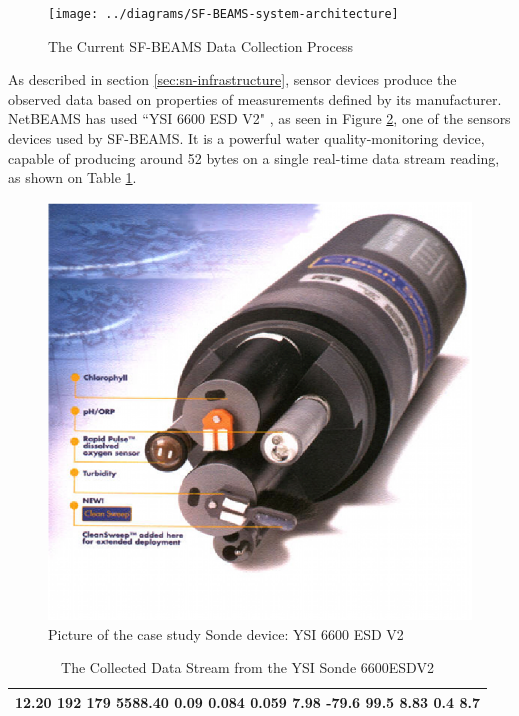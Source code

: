 \begin{figure}[!b]
  \centering
  \texttt{[image: ../diagrams/SF-BEAMS-system-architecture]}
  \caption{The Current SF-BEAMS Data Collection Process}
  \label{fig:SF-BEAMS-system-architecture}
\end{figure}

As described in section \ref{sec:sn-infrastructure}, sensor devices produce
the observed data based on properties of measurements defined by its
manufacturer. NetBEAMS has used ``YSI 6600 ESD V2" \cite{YSI-Sonde}, as seen
in Figure \ref{fig:ysi-device}, one of the sensors devices used by SF-BEAMS.
It is a powerful water quality-monitoring device, capable of producing around
52 bytes on a single real-time data stream reading, as shown on Table
\ref{tab:ysi-data-stream}.

\begin{figure}[!b]
  \centering
  \includegraphics[scale=0.7]{../diagrams/ysi-device}
  \caption{Picture of the case study Sonde device: YSI 6600 ESD V2}
  \label{fig:ysi-device}
\end{figure}

\begin{table}
    \begin{center}
        \begin{tabular}{|l|}\hline
  12.20    192    179 5588.40   0.09   0.084   0.059  7.98   -79.6   99.5  8.83  0.4     8.7\\\hline
        \end{tabular}
    \end{center}
    \label{tab:ysi-data-stream}
    \caption{The Collected Data Stream from the YSI Sonde 6600ESDV2}
\end{table}


